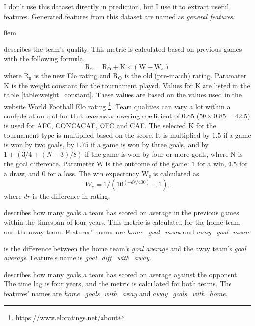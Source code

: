 I don't use this dataset directly in prediction, but I use it to extract useful features. Generated features from this dataset are named as \textit{general features}.
\renewcommand{\labelitemi}{}
\begin{description}
    \itemsep0em
    \item[Elo rating] describes the team's quality. This metric is calculated based on previous games with the following formula \begin{equation}
        \mathrm { R } _ { \mathrm { n } } = \mathrm { R } _ { \mathrm { O } } + \mathrm { K } \times \left( \mathrm { W } - \mathrm { W } _ { \mathrm { e } } \right)
    \end{equation}
    where $\mathrm { R } _ { \mathrm { n } }$ is the new Elo rating and $\mathrm { R }  _ { \mathrm { O } }$ is the old (pre-match) rating. Paramater $\mathrm { K }$ is the weight constant for the tournament played. Values for $\mathrm { K }$ are listed in the table \ref{table:weight_constant}. These values are based on the values used in the website World Football Elo rating \footnote{\url{https://www.eloratings.net/about}}. Team qualities can vary a lot within a confederation and for that reasons a lowering coefficient of $0.85$ ($50 \times 0.85 = 42.5$) is used for AFC, CONCACAF, OFC and CAF. The selected $\mathrm { K }$ for the tournament type is multiplied based on the score. It is multiplied by $1.5$ if a game is won by two goals, by $1.75$ if a game is won by three goals, and by $1 + (3/4 + (N-3)/8)$ if the game is won by four or more goals, where N is the goal difference. Parameter $\mathrm { W }$ is the outcome of the game: $1$ for a win, $0.5$ for a draw, and $0$ for a loss. The win expectancy $\mathrm { W } _ { \mathrm { e } }$ is calculated as
    \begin{equation}
        W _ { e } = 1 / \left( 10 ^ { ( - d r / 400 ) } + 1 \right)\text{,}
    \end{equation}
    where $dr$ is the difference in rating.

    \item[Goal average] describes how many goals a team has scored on average in the previous games within the timespan of four years. This metric is calculated for the home team and the away team. Features' names are \textit{home\_goal\_mean} and \textit{away\_goal\_mean}.
    \item[Goal average difference] is the difference between the home team's \textit{goal average} and the away team's \textit{goal average}. Feature's name is \textit{goal\_diff\_with\_away}.
    \item[Goal average with the opponent] describes how many goals a team has scored on average against the opponent. The time lag is four years, and the metric is calculated for both teams. The features' names are \textit{home\_goals\_with\_away} and \textit{away\_goals\_with\_home}.
\end{description}

